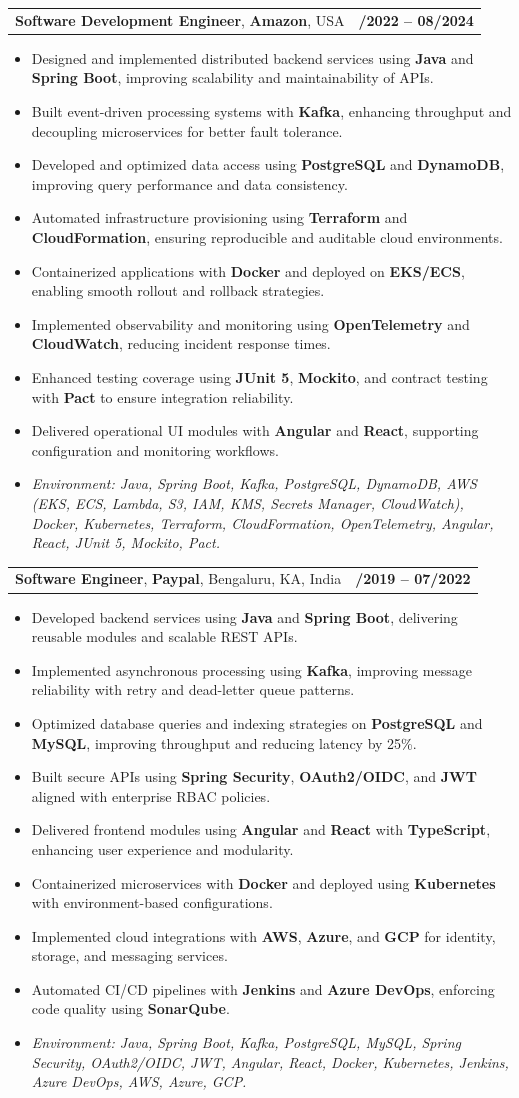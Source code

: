 \documentclass[letterpaper,11pt]{article}
\makeatletter
\newcommand{\resumeItem}[1]{
  \item\footnotesize{
    {#1 \vspace{-2pt}}
  }
}
\newcommand{\resumeSubheading}[4]{
  \vspace{-2pt}\item
    \begin{tabular*}{1.0\textwidth}[t]{l@{\extracolsep{\fill}}r}
      \textbf{\fontsize{10pt}{14pt}\selectfont #3}, \textbf{\fontsize{10pt}{14pt}\selectfont #1}, \fontsize{10pt}{14pt}\selectfont #4 & \textbf{\fontsize{10pt}{14pt}\selectfont #2} \\
    \end{tabular*}\vspace{-7pt}
}
\newcommand{\resumeItemListStart}{\begin{itemize}[leftmargin=*]}
\newcommand{\resumeItemListEnd}{\end{itemize}\vspace{-5pt}}
\makeatother
\begin{document}
\resumeSubheading
{Amazon}{10/2022 -- 08/2024}
{Software Development Engineer}{USA}
\resumeItemListStart
  \resumeItem{Designed and implemented distributed backend services using \textbf{Java} and \textbf{Spring Boot}, improving scalability and maintainability of APIs.}
  \resumeItem{Built event-driven processing systems with \textbf{Kafka}, enhancing throughput and decoupling microservices for better fault tolerance.}
  \resumeItem{Developed and optimized data access using \textbf{PostgreSQL} and \textbf{DynamoDB}, improving query performance and data consistency.}
  \resumeItem{Automated infrastructure provisioning using \textbf{Terraform} and \textbf{CloudFormation}, ensuring reproducible and auditable cloud environments.}
  \resumeItem{Containerized applications with \textbf{Docker} and deployed on \textbf{EKS/ECS}, enabling smooth rollout and rollback strategies.}
  \resumeItem{Implemented observability and monitoring using \textbf{OpenTelemetry} and \textbf{CloudWatch}, reducing incident response times.}
  \resumeItem{Enhanced testing coverage using \textbf{JUnit 5}, \textbf{Mockito}, and contract testing with \textbf{Pact} to ensure integration reliability.}
  \resumeItem{Delivered operational UI modules with \textbf{Angular} and \textbf{React}, supporting configuration and monitoring workflows.}
  \resumeItem{\textit{Environment: Java, Spring Boot, Kafka, PostgreSQL, DynamoDB, AWS (EKS, ECS, Lambda, S3, IAM, KMS, Secrets Manager, CloudWatch), Docker, Kubernetes, Terraform, CloudFormation, OpenTelemetry, Angular, React, JUnit 5, Mockito, Pact.}}
\resumeItemListEnd

\resumeSubheading
{Paypal}{08/2019 -- 07/2022}
{Software Engineer}{Bengaluru, KA, India}
\resumeItemListStart
  \resumeItem{Developed backend services using \textbf{Java} and \textbf{Spring Boot}, delivering reusable modules and scalable REST APIs.}
  \resumeItem{Implemented asynchronous processing using \textbf{Kafka}, improving message reliability with retry and dead-letter queue patterns.}
  \resumeItem{Optimized database queries and indexing strategies on \textbf{PostgreSQL} and \textbf{MySQL}, improving throughput and reducing latency by 25\%.}
  \resumeItem{Built secure APIs using \textbf{Spring Security}, \textbf{OAuth2/OIDC}, and \textbf{JWT} aligned with enterprise RBAC policies.}
  \resumeItem{Delivered frontend modules using \textbf{Angular} and \textbf{React} with \textbf{TypeScript}, enhancing user experience and modularity.}
  \resumeItem{Containerized microservices with \textbf{Docker} and deployed using \textbf{Kubernetes} with environment-based configurations.}
  \resumeItem{Implemented cloud integrations with \textbf{AWS}, \textbf{Azure}, and \textbf{GCP} for identity, storage, and messaging services.}
  \resumeItem{Automated CI/CD pipelines with \textbf{Jenkins} and \textbf{Azure DevOps}, enforcing code quality using \textbf{SonarQube}.}
  \resumeItem{\textit{Environment: Java, Spring Boot, Kafka, PostgreSQL, MySQL, Spring Security, OAuth2/OIDC, JWT, Angular, React, Docker, Kubernetes, Jenkins, Azure DevOps, AWS, Azure, GCP.}}
\resumeItemListEnd
\end{document}
